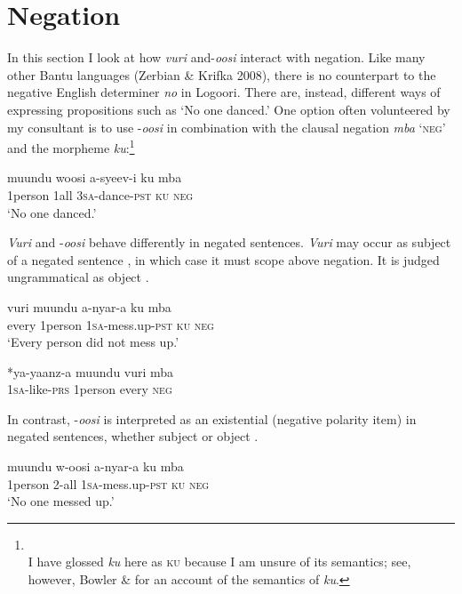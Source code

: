 \documentclass[output=paper]{langsci/langscibook}
\begin{document}
\section{Negation}

  In this section I look at how \textit{vuri} and-\textit{oosi} interact with negation. Like many other Bantu languages (Zerbian \& Krifka 2008), there is no counterpart to the negative English determiner \textit{no} in Logoori. There are, instead, different ways of expressing propositions such as ‘No one danced.’ One option often volunteered by my consultant is to use -\textit{oosi} in combination with the clausal negation \textit{mba} ‘\textsc{neg}’\textit{} and the morpheme \textit{ku}:\footnote{\\
 I have glossed \textit{ku} here as \textsc{ku} because I am unsure of its semantics; see, however, Bowler \& \citet{Gluckman2015} for an account of the semantics of \textit{ku}.}

\ea
\gll muundu   woosi  a-syeev-i    ku  mba\\
     1person\textsc{}    1all    3\textsc{sa}{}-dance-\textsc{pst}  \textsc{ku}  \textsc{neg} \\
\glt ‘No one danced.’
\z

  \textit{Vuri} and -\textit{oosi} behave differently in negated sentences. \textit{Vuri} may occur as subject of a negated sentence , in which case it must scope above negation. It is judged ungrammatical as object .

\ea 
\gll vuri  muundu  a-nyar-a    ku  mba  \\
     every  1person  1\textsc{sa}{}-mess.up-\textsc{pst}  \textsc{ku}  \textsc{neg}\\
\glt ‘Every person did not mess up.’       \textit{} 
\z

\ea
\gll \textup{*}ya-yaanz-a  muundu   vuri    mba \\
     1\textsc{sa}{}-like-\textsc{prs}  1person     every    \textsc{neg}\\
\z

  In contrast, -\textit{oosi} is interpreted as an existential (negative polarity item) in negated sentences, whether subject  or object .

\ea 
\gll muundu  w-oosi    a-nyar-a    ku  mba  \\
     1person  2-all    1\textsc{sa}{}-mess.up-\textsc{pst}  \textsc{ku  neg}\\
\glt ‘No one messed up.’       \textit{} 
\z
\end{document}
